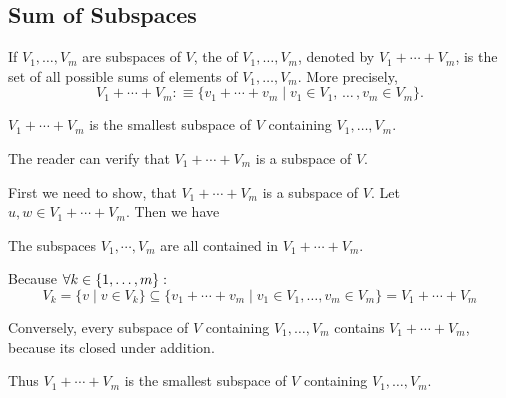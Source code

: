 
\subsection{Sum of Subspaces}

\setcounter{thm}{35}
\begin{mydef}
  If $V_1, \ldots, V_m$ are subspaces of $V$, the  of $V_1, \ldots, V_m$, denoted by $V_1 + \cdots + V_m$, is the set of all possible sums of elements of $V_1, \ldots, V_m$. More precisely,
\begin{equation}
    V_1 + \cdots + V_m :\equiv \{v_1 + \cdots + v_m \mid v_1 \in V_1, \, \dots \, , v_m \in V_m \}.
\end{equation}
\end{mydef}

\setcounter{thm}{39}
\begin{thm}
  $V_1 + \cdots + V_m$ is the smallest subspace of $V$ containing $V_1, \dots, V_m$.
\end{thm}
\begin{prf}
  The reader can verify that $V_1 + \cdots + V_m$ is a subspace of $V$.
  
  First we need to show, that $V_1 + \cdots + V_m$ is a subspace of $V$. Let $u,w \in V_1 + \cdots + V_m$. Then we have 
  
  The subspaces $V_1, \cdots, V_m$ are all contained in $V_1+\cdots+V_m$. 
  
  Because $\forall k \in \{1, \dots, m \}:$
  \begin{equation}
    V_k = \{ v \mid v \in V_k \} \subseteq \{v_1 + \cdots + v_m \mid v_1 \in V_1,  \ldots , v_m \in V_m \} = V_1 + \cdots + V_m
  \end{equation}
  
  Conversely, every subspace of $V$ containing $V_1, \ldots, V_m$ contains $V_1 + \cdots + V_m$, because its closed under addition.
  
  Thus $V_1 + \cdots + V_m$ is the smallest subspace of $V$ containing $V_1, \ldots, V_m$.
\end{prf}

